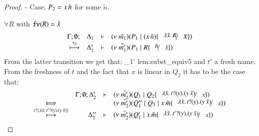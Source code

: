 \begin{proof}
	\noi - Case: $P_2 = x\,\tilde{n}$ for some $\tilde{n}$.


	\noi $\forall R$ with $\mathtt{fv}(R) = \tilde{x}$
%
	\[
		\mhorel{\Gamma}{\Delta_1}{\newsp{\tilde{m_1}}{P_1 \Par (\appl{x}{\tilde{n}}) \subst{\abs{\tilde{x}}{R}}{X}}}
		{\hby{\btau}}
		{\Delta_1'}{}{\newsp{\tilde{m_1'}}{P_1 \Par  R \subst{\tilde{n}}{\tilde{x}}}}
	\]
%
	\noi From the latter transition we get that:
%
	{\hby{\btau} }
	{\Delta_1'}{}
	{lem:subst_equiv5}
%
%
	\noi and $t'$ a fresh name. From the freshness of $t$ and the fact that $x$ is linear in $Q_2$
	it has to be the case that:
%
	\[
		\begin{array}{crll}
			&\Gamma; \es; \Delta_2'& \proves &
			\newsp{\tilde{m_2'}}{Q_1 \Par Q_2 \subst{\auxtr{t}}{x}}\\
			\Hby{} & & &
			\newsp{\tilde{m_2'}}{Q_1'' \Par Q_3 \Par \appl{x}{\tilde{m}} \subst{\auxtr{t}}{x}} \\
			\hby{\bactinp{t}{\auxtr{t'}}}
			& \Delta_2''& \proves& \newsp{\tilde{m_2'}}{Q_1' \Par \appl{x}{\tilde{m}} \subst{\auxtr{t'}}{x}}
		\end{array}
	\]
%
%

\end{proof}
